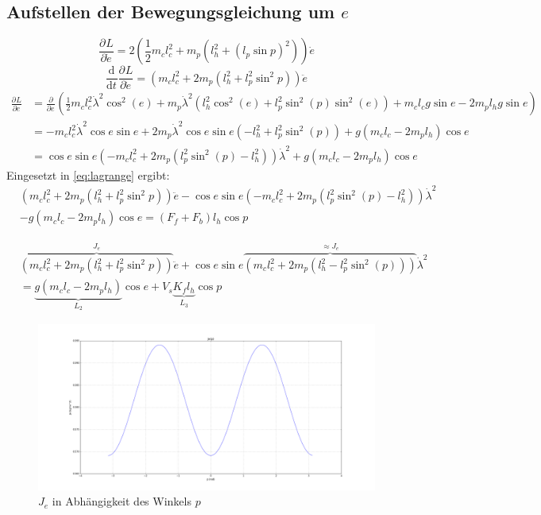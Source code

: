 \documentclass{article}
\newcommand{\partiell}[3][]{\frac{\partial^{#1}#2}{\partial{#3}^{#1}}}
\newcommand{\diff}[3][]{\frac{\mathrm{d}^{#1}#2}{\mathrm{d}{#3}^{#1}}}
\begin{document}
	\subsection{Aufstellen der Bewegungsgleichung um $e$}
	\begin{equation}
	\partiell{L}{\dot{e}} = 2(\frac{1}{2}m_cl_c^2
	+ m_p(l_h^2+(l_p\sin p)^2))\dot{e}
	\end{equation}
	\begin{equation}
	\diff{}{t}\partiell{L}{\dot{e}} = (m_cl_c^2
	+ 2 m_p(l_h^2+l_p^2\sin^2 p))\ddot{e}
	\end{equation}
	\begin{equation}
	\begin{split}
	\partiell{L}{e} &= \partiell{}{e}(\frac{1}{2} m_c l_c^2 \dot{\lambda}^2 \cos^2 (e) + m_p \dot{\lambda}^2 (l_h^2 \cos^2 (e) + l_p^2 \sin^2 (p) \sin^2 (e))
	+ m_c l_c g \sin e - 2 m_p l_h g \sin e)\\
	&= -m_c l_c^2 \dot{\lambda}^2 \cos e \sin e + 2 m_p \dot{\lambda}^2 \cos e \sin e (-l_h^2  + l_p^2 \sin^2 (p) ) + g(m_c l_c - 2 m_p l_h) \cos e\\
	&= \cos e \sin e  (-m_c l_c^2 + 2 m_p (l_p^2 \sin^2 (p) -l_h^2  )) \dot{\lambda}^2+ g(m_c l_c - 2 m_p l_h) \cos e
	\end{split}
	\end{equation}
	Eingesetzt in \eqref{eq:lagrange} ergibt:
	\begin{equation}
	\begin{split}
	&(m_cl_c^2+ 2 m_p(l_h^2+l_p^2\sin^2 p))\ddot{e} - \cos e \sin e (-m_c l_c^2 + 2 m_p (l_p^2 \sin^2 (p) -l_h^2  ))\dot{\lambda}^2 \\
	& - g(m_c l_c - 2 m_p l_h) \cos e = (F_f + F_b)l_h  \cos p
	\end{split}
	\end{equation}
	
	\begin{equation}
	\begin{split}
	&\overbrace{(m_cl_c^2+ 2 m_p(l_h^2+l_p^2\sin^2 p))}^{J_e}\ddot{e} + \cos e \sin e \overbrace{(m_c l_c^2 + 2 m_p ( l_h^2 -l_p^2 \sin^2 (p) ))}^{\approx J_e} \dot{\lambda}^2 \\
	&= \underbrace{g(m_c l_c - 2 m_p l_h)}_{L_2} \cos e + V_s \underbrace{ K_f l_h}_{L_3}  \cos p
	\end{split}
	\end{equation}
	\begin{figure}[ht]
		\centering
		\includegraphics[width=1\textwidth]{images/J_e}
		\caption{$J_e$ in Abhängigkeit des Winkels $p$}
		\label{fig:J_e}
	\end{figure}
\end{document}
